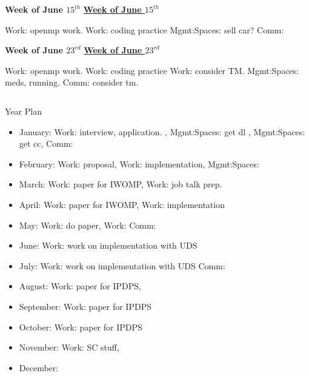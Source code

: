 \begin{columns}
\begin{column}{0.333\columnwidth}
\begin{columns}
\begin{column}{0.5\columnwidth}
\ifdefined\POSTER
\begin{block}{\small \bf Week of June $15^{th}$}
\else
\underline{\bf Week of June $15^{th}$}\\
\fi
\begin{framed}
\begin{enumerate}
\mpitem Work: openmp work.
\mpitem Work: coding practice
\mpitem Mgmt:Spaces: sell car? 
\mpitem Comm: 
\end{enumerate}

\end{framed}
\ifdefined\POSTER 
\end{block}
\fi


\ifdefined\POSTER
\begin{block}{\small \bf Week of June $23^{rd}$}
\else
\underline{\bf Week of June $23^{rd}$}\\
\fi
\begin{framed}
\begin{enumerate}
\mpitem Work: openmp work.
\mpitem Work: coding practice
\mpitem Work: consider TM. 
\mpitem Mgmt:Spaces: meds, running. 
\mpitem Comm: consider tm.
\end{enumerate}
\end{framed}
\ifdefined\POSTER 
\end{block}
\fi


\end{column}

\end{columns}
\begin{columns}  %
\begin{column}{0.10\linewidth}

\begin{block}{Year Plan}
\begin{itemize}
\tiny \item \tiny January: Work: interview, application. , Mgmt:Spaces: get dl , Mgmt:Spaces: get cc, Comm: 
\item \tiny February: Work: proposal, Work: implementation, Mgmt:Spaces: 
\item \tiny March: Work: paper for IWOMP, Work: job talk prep.
\item \tiny April: Work: paper for IWOMP, Work: implementation  
\item \tiny May: Work: do paper, Work: Comm: 
\item \tiny June: Work: work on implementation with UDS 
\item \tiny July: Work: work on implementation with UDS Comm:  
\item \tiny August: Work: paper for IPDPS, 
\item \tiny September: Work: paper for IPDPS 
\item \tiny October: Work: paper for IPDPS  
\item \tiny November: Work: SC stuff, 
\item \tiny December: 
\end{itemize} 
\end{block}


\end{column}
\end{columns}
\end{column}
\end{columns}
